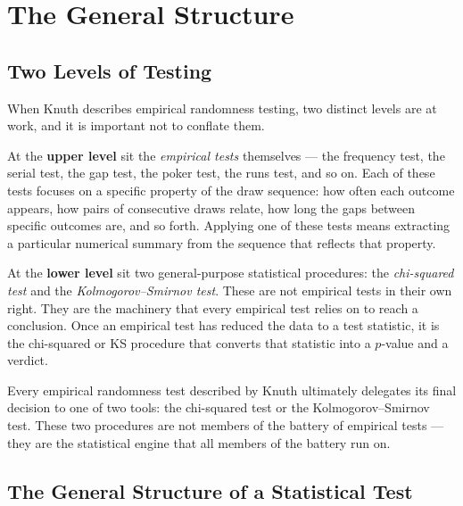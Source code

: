 \chapter{The General Structure}
 
\section{Two Levels of Testing}
 
When Knuth describes empirical randomness testing\cite{knuth:1997-taocp-2}, two distinct levels are
at work, and it is important not to conflate them.
 
At the \textbf{upper level} sit the \emph{empirical tests} themselves ---
the frequency test, the serial test, the gap test, the poker test, the runs
test, and so on.  Each of these tests focuses on a specific property of the
draw sequence: how often each outcome appears, how pairs of consecutive
draws relate, how long the gaps between specific outcomes are, and so forth.
Applying one of these tests means extracting a particular numerical summary
from the sequence that reflects that property.
 
At the \textbf{lower level} sit two general-purpose statistical procedures:
the \emph{chi-squared test} and the \emph{Kolmogorov--Smirnov test}.  These
are not empirical tests in their own right.  They are the machinery that
every empirical test relies on to reach a conclusion.  Once an empirical
test has reduced the data to a test statistic, it is the chi-squared or KS
procedure that converts that statistic into a $p$-value and a verdict.
 
\begin{keyidea}
Every empirical randomness test described by Knuth ultimately delegates its
final decision to one of two tools: the chi-squared test or the
Kolmogorov--Smirnov test.  These two procedures are not members of the
battery of empirical tests --- they are the statistical engine that all
members of the battery run on.
\end{keyidea}
 
\section{The General Structure of a Statistical Test}
 
